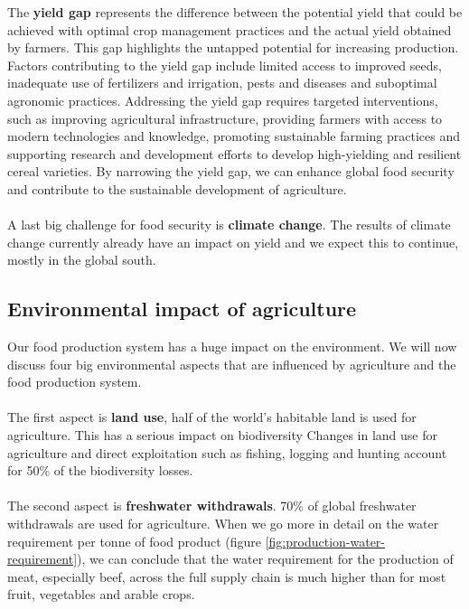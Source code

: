 \documentclass[../summary.tex]{subfiles}
\begin{document}
	The \textbf{yield gap} represents the difference between the potential yield that could be achieved with optimal crop management practices and the actual yield obtained by farmers. This gap highlights the untapped potential for increasing production. Factors contributing to the yield gap include limited access to improved seeds, inadequate use of fertilizers and irrigation, pests and diseases and suboptimal agronomic practices. Addressing the yield gap requires targeted interventions, such as improving agricultural infrastructure, providing farmers with access to modern technologies and knowledge, promoting sustainable farming practices and supporting research and development efforts to develop high-yielding and resilient cereal varieties. By narrowing the yield gap, we can enhance global food security and contribute to the sustainable development of agriculture.
	\\\\
	A last big challenge for food security is \textbf{climate change}. The results of climate change currently already have an impact on yield and we expect this to continue, mostly in the global south.
	\newpage
	
	\subsection{Environmental impact of agriculture}
	
	Our food production system has a huge impact on the environment. We will now discuss four big environmental aspects that are influenced by agriculture and the food production system.
	\\\\
	The first aspect is \textbf{land use}, half of the world's habitable land is used for agriculture. This has a serious impact on biodiversity Changes in land use for agriculture and direct exploitation such as fishing, logging and hunting account for 50\% of the biodiversity losses. 
	\\\\
	The second aspect is \textbf{freshwater withdrawals}. 70\% of global freshwater withdrawals are used for agriculture. When we go more in detail on the water requirement per tonne of food product (figure \ref{fig:production-water-requirement}), we can conclude that the water requirement for the production of meat, especially beef, across the full supply chain is much higher than for most fruit, vegetables and arable crops.
	\\
	
\end{document}
